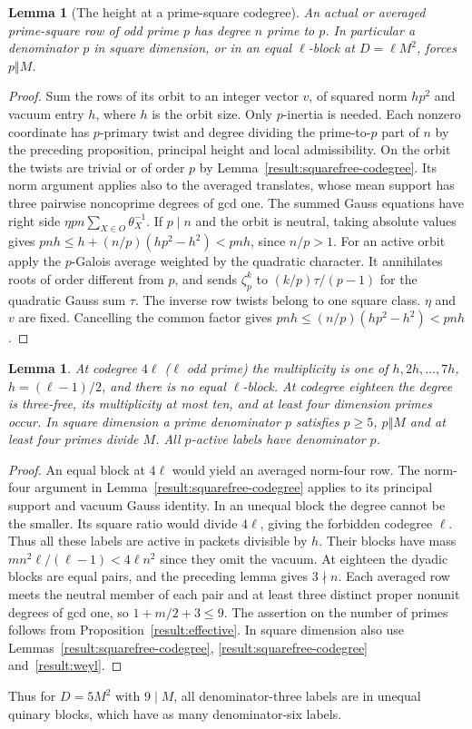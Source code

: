 \documentclass[11pt]{amsart}
\numberwithin{equation}{section}
\newtheorem{lemma}[theorem]{Lemma}
\theoremstyle{definition}
\theoremstyle{plain}
\begin{document}
\begin{lemma}[The height at a prime-square codegree]\label{result:height}
An actual or averaged prime-square row of odd prime $p$ has degree
$n$ prime to $p$. In particular a denominator $p$ in square dimension,
or in an equal $\ell$-block at $D=\ell M^2$, forces $p\Vert M$.
\end{lemma}
\begin{proof}
Sum the rows of its orbit to an integer vector $v$, of squared norm
$hp^2$ and vacuum entry $h$, where $h$ is the orbit size. Only
$p$-inertia is needed. Each nonzero coordinate has $p$-primary twist
and degree dividing the prime-to-$p$ part of $n$ by the preceding
proposition, principal height and local admissibility. On the orbit
the twists are trivial or of order $p$ by Lemma~\ref{result:squarefree-codegree}.
Its norm argument applies also to the averaged translates, whose mean
support has three pairwise noncoprime degrees of gcd one.
The summed Gauss equations have right side
$\eta pn\sum_{X\in O}\theta_X^{-1}$. If $p\mid n$ and the orbit is
neutral, taking absolute values gives
$ pnh\le h+(n/p)(hp^2-h^2)<pnh$, since $n/p>1$.
For an active orbit apply the $p$-Galois average weighted by the
quadratic character. It annihilates roots of order different from
$p$, and sends $\zeta_p^k$ to $(k/p)\tau/(p-1)$ for the quadratic
Gauss sum $\tau$. The inverse row twists belong to one square class.
$\eta$ and $v$ are fixed. Cancelling the common factor gives
$pnh\le (n/p)(hp^2-h^2)<pnh$.
\end{proof}

\begin{lemma}\label{result:small-effective}
At codegree $4\ell$ ($\ell$ odd prime) the multiplicity is one of
$h,2h,\ldots,7h$, $h=(\ell-1)/2$, and there is no equal $\ell$-block.
At codegree eighteen the degree is three-free, its multiplicity at most
ten, and at least four dimension primes occur. In square dimension a
prime denominator $p$ satisfies $p\ge5$, $p\Vert M$ and at least four
primes divide $M$. All $p$-active labels have denominator $p$.
\end{lemma}
\begin{proof}
An equal block at $4\ell$ would yield an averaged norm-four row.
The norm-four argument in Lemma~\ref{result:squarefree-codegree} applies to its principal support and vacuum Gauss identity.
In an unequal block the degree cannot be the smaller. Its square
ratio would divide $4\ell$, giving the forbidden codegree $\ell$.
Thus all these labels are active in packets divisible by $h$. Their
blocks have mass $mn^2\ell/(\ell-1)<4\ell n^2$ since they omit the
vacuum. At eighteen the dyadic blocks are equal pairs, and the
preceding lemma gives $3\nmid n$. Each averaged row meets the neutral
member of each pair and at least three distinct proper nonunit degrees
of gcd one, so $1+m/2+3\le9$. The assertion on the number of primes
follows from Proposition~\ref{result:effective}. In square dimension
also use Lemmas~\ref{result:squarefree-codegree}, \ref{result:squarefree-codegree} and~\ref{result:weyl}.
\end{proof}
Thus for $D=5M^2$ with $9\mid M$, all denominator-three labels are in
unequal quinary blocks, which have as many denominator-six labels.
\end{document}
